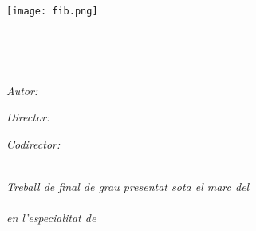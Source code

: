\documentclass[
11pt, %
catalan, %
singlespacing, %
headsepline, %
chapterinoneline, %
table
]{MastersDoctoralThesis} %
\author{Joaquim \textsc{Motger de la Encarnación}} %
\begin{document}
\frontmatter %

\pagestyle{plain} %


\begin{titlepage}
\begin{center}

\texttt{[image: fib.png]}\vspace{4.0cm} %

\HRule \\[0.4cm] %
{\huge \bfseries \ttitle\par}\vspace{0.4cm} %
\HRule \\[1.5cm] %
 
\begin{minipage}[t]{0.4\textwidth}
\begin{flushleft} \large
\emph{Autor:}\\
\href{}{\authorname} %
\end{flushleft}
\end{minipage}
\begin{minipage}[t]{0.4\textwidth}
\begin{flushright} \large
\emph{Director:} \\
\href{}{\supname} %
\end{flushright}
\begin{flushright} \large
\emph{Codirector:} \\
\href{}{\examname} %
\end{flushright}
\end{minipage}\\[6cm]
 

\large \textit{Treball de final de grau presentat sota el marc del}\\[0.3cm] %
\degreename\\[0.5cm]
\textit{en l'especialitat de}\\[0.3cm]
\groupname\\[2cm] %
 
 
\vfill
\end{center}
\end{titlepage}
\end{document}
